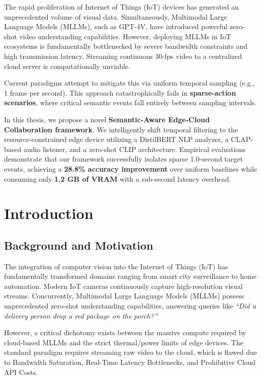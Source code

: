 \documentclass[11pt, a4paper, oneside]{report}
\begin{document}
\begin{highlightbox}
The rapid proliferation of Internet of Things (IoT) devices has generated an unprecedented volume of visual data. Simultaneously, Multimodal Large Language Models (MLLMs), such as GPT-4V, have introduced powerful zero-shot video understanding capabilities. However, deploying MLLMs in IoT ecosystems is fundamentally bottlenecked by severe bandwidth constraints and high transmission latency. Streaming continuous 30-fps video to a centralized cloud server is computationally unviable. 

Current paradigms attempt to mitigate this via uniform temporal sampling (e.g., 1 frame per second). This approach catastrophically fails in \textbf{sparse-action scenarios}, where critical semantic events fall entirely between sampling intervals. 

In this thesis, we propose a novel \textbf{Semantic-Aware Edge-Cloud Collaboration framework}. We intelligently shift temporal filtering to the resource-constrained edge device utilizing a DistilBERT NLP analyzer, a CLAP-based audio listener, and a zero-shot CLIP architecture. Empirical evaluations demonstrate that our framework successfully isolates sparse 1.0-second target events, achieving a \textbf{28.8\% accuracy improvement} over uniform baselines while consuming only \textbf{1.2 GB of VRAM} with a sub-second latency overhead.
\end{highlightbox}
\newpage

\chapter{Introduction}

\section{Background and Motivation}
The integration of computer vision into the Internet of Things (IoT) has fundamentally transformed domains ranging from smart city surveillance to home automation. Modern IoT cameras continuously capture high-resolution visual streams. Concurrently, Multimodal Large Language Models (MLLMs) possess unprecedented zero-shot understanding capabilities, answering queries like \textit{``Did a delivery person drop a red package on the porch?''}

However, a critical dichotomy exists between the massive compute required by cloud-based MLLMs and the strict thermal/power limits of edge devices. The standard paradigm requires streaming raw video to the cloud, which is flawed due to Bandwidth Saturation, Real-Time Latency Bottlenecks, and Prohibitive Cloud API Costs.
\end{document}
